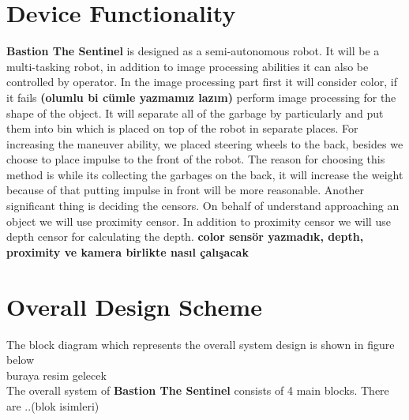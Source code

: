 \documentclass[12pt,a4paper]{article}
\begin{document}
\section{Device Functionality}
 \begin{flushleft}
  \textbf{Bastion The Sentinel} is designed as a semi-autonomous robot. It will be a multi-tasking robot, in addition to 
  image processing abilities it can also be controlled by operator. In the image processing part first it will consider color, 
  if it fails \textbf{(olumlu bi cümle yazmamız lazım)} perform image processing for the shape of the object. It will separate 
  all of the garbage by particularly and put them into bin which is placed on top of the robot in separate places. For increasing 
  the maneuver ability, we placed steering wheels to the back, besides we choose to place impulse to the front of the robot. The 
  reason for choosing this method is while its collecting the garbages on the back, it will increase the weight because of that 
  putting impulse in front will be more reasonable. Another significant thing is deciding the censors. On behalf of understand 
  approaching an object we will use proximity censor. In addition to proximity censor we will use depth censor for calculating 
  the depth. \textbf{color sensör yazmadık, depth, proximity ve kamera birlikte nasıl çalışacak}
 \end{flushleft}
 
 \section{Overall Design Scheme}
 \begin{flushleft}
  The block diagram which represents the overall system design is shown in figure below\\
  buraya resim gelecek\\
  The overall system of \textbf{Bastion The Sentinel} consists of 4 main blocks. There are ..(blok isimleri)
 \end{flushleft}
 
\end{document}
